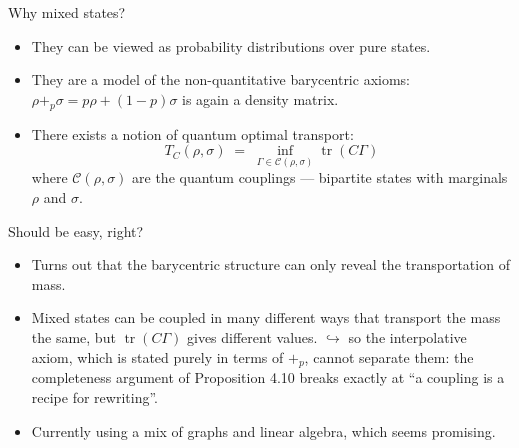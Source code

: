 \documentclass[10pt,aspectratio=169]{beamer}
\newcommand{\bpl}[1]{+_{#1}}
\begin{document}
\begin{frame}{Why mixed states?}
  \begin{itemize}
    \item[--] They can be viewed as probability distributions over pure
      states.
      \medskip
    \item[--] They are a model of the non-quantitative barycentric
      axioms: $\rho \bpl{p} \sigma = p\rho + (1-p)\sigma$ is again a
      density matrix.
      \medskip
    \item[--] There exists a notion of quantum optimal
      transport:
      \[
        T_C(\rho,\sigma) \;=\;
        \inf_{\Gamma \in \mathcal{C}(\rho,\sigma)} \operatorname{tr}(C\Gamma)
      \]
      where $\mathcal{C}(\rho,\sigma)$ are the quantum couplings ---
      bipartite states with marginals $\rho$ and $\sigma$.
  \end{itemize}
\end{frame}

\begin{frame}{Should be easy, right?}
  \begin{itemize}
    \item[--] Turns out that the barycentric structure can only reveal
      the transportation of mass.
      \medskip
    \item[--] Mixed states can be coupled in many different ways that
      transport the mass the same, but $\operatorname{tr}(C\Gamma)$
      gives different values.
      \medskip
      {\small $\hookrightarrow$ so the interpolative axiom, which is
      stated purely in terms of $\bpl{p}$, cannot separate them: the
      completeness argument of Proposition 4.10 breaks exactly at
      ``a coupling is a recipe for rewriting''.}
      \medskip
    \item[--] Currently using a mix of graphs and linear
      algebra, which seems promising.
  \end{itemize}
\end{frame}

\end{document}
